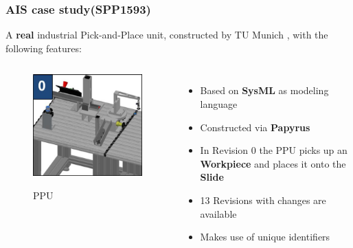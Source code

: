 \documentclass[10pt]{beamer}
\begin{document}
\begin{frame}
\frametitle{AIS case study(SPP1593)}
A \textbf{real} industrial Pick-and-Place unit, constructed by
TU Munich \cite{aiscasestudy}, with the following features:
 \begin{columns}
\begin{center}
\begin{figure}%
\includegraphics[scale=0.3]{ppu_rev0}\\
\caption{PPU \cite{aiscasestudy}}
\end{figure}
\end{center}   
  \begin{itemize}
    \item Based on \textbf{SysML} as modeling language
    \item Constructed via \textbf{Papyrus}    
    \item In Revision 0 the PPU picks up an \textbf{Workpiece} and places it
    onto the \textbf{Slide}    	  
    \item 13 Revisions with changes are available
    \item Makes use of unique identifiers
\end{itemize}
\end{columns}
\end{frame}
\end{document}

